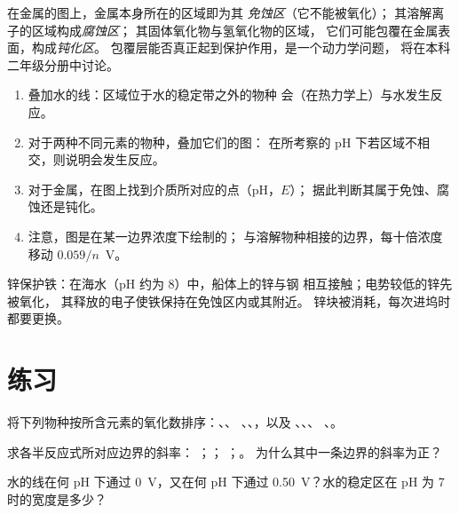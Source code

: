 \begin{definition}\label{def:b1:e-ph-diagrams:corrosion-domains}
在金属的图上，金属本身所在的区域即为其
\emph{免蚀区}（它不能被氧化）；
其溶解离子的区域构成\emph{腐蚀区}；
其固体氧化物与氢氧化物的区域，
它们可能包覆在金属表面，构成\emph{钝化区}。
包覆层能否真正起到保护作用，是一个动力学问题，
将在本科二年级分册中讨论。
\end{definition}

\begin{method}[读图方法]\label{met:b1:e-ph-diagrams:read}
\begin{enumerate}
  \item 叠加水的线：区域位于水的稳定带之外的物种
        会（在热力学上）与水发生反应。
  \item 对于两种不同元素的物种，叠加它们的图：
        在所考察的 pH 下若区域不相交，则说明会发生反应。
  \item 对于金属，在图上找到介质所对应的点（pH，$E$）；
        据此判断其属于免蚀、腐蚀还是钝化。
  \item 注意，图是在某一边界浓度下绘制的；
        与溶解物种相接的边界，每十倍浓度
        移动 $0.059/n$~V。
\end{enumerate}
\end{method}

锌保护铁：在海水（pH 约为 8）中，船体上的锌与钢
相互接触；电势较低的锌先被氧化，
其释放的电子使铁保持在免蚀区内或其附近。
锌块被消耗，每次进坞时都要更换。

\section{练习}

\begin{exercise}[$\star$]\label{exo:b1:e-ph-diagrams:1}
将下列物种按所含元素的氧化数排序：、、
、、，以及 、、、
、。
\end{exercise}

\begin{exercise}[$\star$]\label{exo:b1:e-ph-diagrams:2}
求各半反应式所对应边界的斜率：
；；
；。
为什么其中一条边界的斜率为正？
\end{exercise}

\begin{exercise}[$\star$]\label{exo:b1:e-ph-diagrams:3}
水的线在何 pH 下通过 0~V，又在何 pH 下通过
\qty{0.50}{V}？水的稳定区在
pH 为 7 时的宽度是多少？
\end{exercise}

